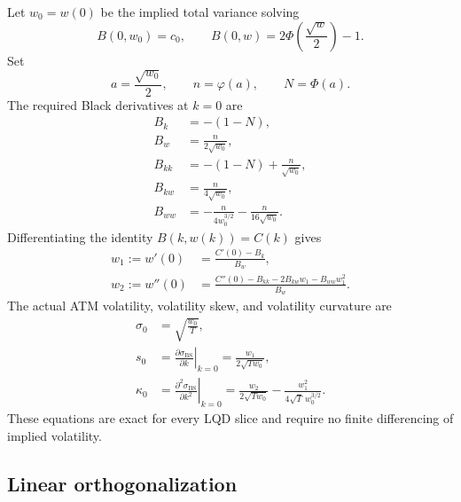 \documentclass[11pt]{article}
\newcommand{\1}{\mathbf{1}}
\newcommand{\PhiN}{\Phi}
\newcommand{\phin}{\varphi}
\begin{document}
Let $w_0=w(0)$ be the implied total variance solving
\begin{equation}
    B(0,w_0)=c_0,
    \qquad B(0,w)=2\PhiN\left(\frac{\sqrt w}{2}\right)-1.\label{eq:w0_atm}
\end{equation}
Set
\begin{equation}
    a=\frac{\sqrt{w_0}}{2},\qquad n=\phin(a),\qquad N=\PhiN(a).
\end{equation}
The required Black derivatives at $k=0$ are
\begin{align}
    B_k&=-(1-N),\label{eq:Bk}\\
    B_w&=\frac{n}{2\sqrt{w_0}},\label{eq:Bw}\\
    B_{kk}&=-(1-N)+\frac{n}{\sqrt{w_0}},\label{eq:Bkk}\\
    B_{kw}&=\frac{n}{4\sqrt{w_0}},\label{eq:Bkw}\\
    B_{ww}&=-\frac{n}{4w_0^{3/2}}-\frac{n}{16\sqrt{w_0}}.\label{eq:Bww}
\end{align}
Differentiating the identity $B(k,w(k))=C(k)$ gives
\begin{align}
    w_1:=w'(0)&=\frac{C'(0)-B_k}{B_w},\label{eq:w1}\\
    w_2:=w''(0)&=\frac{C''(0)-B_{kk}-2B_{kw}w_1-B_{ww}w_1^2}{B_w}.\label{eq:w2}
\end{align}
The actual ATM volatility, volatility skew, and volatility curvature are
\begin{align}
    \sigma_0&=\sqrt{\frac{w_0}{T}},\label{eq:sigma0}\\
    s_0&=\left.\frac{\partial\sigma_{\mathrm{BS}}}{\partial k}\right|_{k=0}=\frac{w_1}{2\sqrt{T w_0}},\label{eq:skew0}\\
    \kappa_0&=\left.\frac{\partial^2\sigma_{\mathrm{BS}}}{\partial k^2}\right|_{k=0}
    =\frac{w_2}{2\sqrt{T w_0}}-\frac{w_1^2}{4\sqrt T\,w_0^{3/2}}.\label{eq:curv0}
\end{align}
These equations are exact for every LQD slice and require no finite differencing of implied volatility.

\subsection{Linear orthogonalization}
\end{document}

